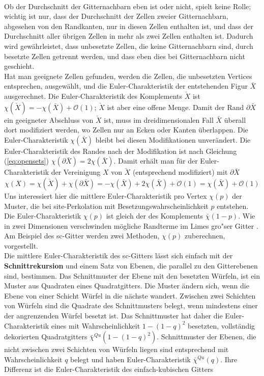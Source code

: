 \\Ob der Durchschnitt der Gitternachbarn eben ist oder nicht, spielt keine Rolle; wichtig ist nur, dass der Durchschnitt der Zellen zweier Gitternachbarn, abgesehen von den Randkanten, nur in diesen Zellen enthalten ist, und dass der Durchschnitt aller \"ubrigen Zellen in mehr als zwei Zellen enthalten ist. Dadurch wird gew\"ahrleistet, dass unbesetzte Zellen, die keine Gitternachbarn sind, durch besetzte Zellen getrennt werden, und dass eben dies bei Gitternachbarn nicht geschieht.
\\Hat man geeignete Zellen gefunden, werden die Zellen, die unbesetzten Vertices entsprechen, ausgew\"ahlt, und die Euler-Charakteristik der entstehenden Figur $\bar{X}$ ausgerechnet. Die Euler-Charakteristik des Komplements $\check{X}$ ist $\chi(\check{X})=-\chi(\bar{X})+\mathcal{O}(1)$; $\check{X}$ ist aber eine offene Menge. Damit der Rand $\partial \bar{X}$ ein geeigneter Abschluss von $\check{X}$ ist, muss im dreidimensionalen Fall $\bar{X}$ \"uberall dort modifiziert werden, wo Zellen nur an Ecken oder Kanten \"uberlappen. Die Euler-Charakteristik $\chi(\bar{X})$ bleibt bei diesen Modifikationen unver\"andert. Die Euler-Charakteristik des Randes nach der Modifikation ist nach Gleichung (\ref{eq:opensets}) $\chi(\partial \bar{X})=2\chi(\bar{X})$. Damit erh\"alt man f\"ur der Euler-Charakteristik der Vereinigung $X$ von $\check{X}$ (entsprechend modifiziert) mit $\partial \bar{X}$ 
\begin{equation}
  \chi(X)=\chi(\check{X})+\chi(\partial \bar{X})=-\chi(\bar{X})+2\chi(\bar{X})+\mathcal{O}(1)=\chi(\bar{X})+\mathcal{O}(1)
\end{equation}
Uns interessiert hier die mittlere Euler-Charakteristik pro Vertex $\chi(p)$ der Muster, die bei site-Perkolation mit Besetzungswahrscheinlichkeit $p$ entstehen. Die Euler-Charakteristik $\chi(p)$ ist gleich der des Komplements $\bar{\chi}(1-p)$. Wie in zwei Dimensionen verschwinden m\"ogliche Randterme im Limes gro"ser Gitter \cite{Jung:00}. Am Beispiel des sc-Gitter werden zwei Methoden, $\chi(p)$ zuberechnen, vorgestellt.
\\Die mittlere Euler-Charakteristik des sc-Gitters l\"asst sich einfach mit der \textbf{Schnittrekursion} und einem Satz von Ebenen, die parallel zu den Gitterebenen sind, bestimmen. Das Schnittmuster der Ebene mit den besetzten W\"urfeln, ist ein Muster aus Quadraten eines Quadratgitters. Die Muster \"andern sich, wenn die Ebene von einer Schicht W\"urfel in die n\"achste wandert. Zwischen zwei Schichten von W\"urfeln sind die Quadrate des Schnittmusters belegt, wenn mindestens einer der angrenzenden W\"urfel besetzt ist. Das Schnittmuster hat daher die Euler-Charakteristik eines mit Wahrscheinlichkeit $1-(1-q)^2$ besetzten, vollst\"andig dekorierten Quadratgitters $\bar{\chi}^{Qu}(1-(1-q)^2)$. Schnittmuster der Ebenen, die nicht zwischen zwei Schichten von W\"urfeln liegen sind entsprechend mit Wahrscheinlichkeit $q$ belegt und haben Euler-Charakteristik $\bar{\chi}^{Qu}(q)$. Ihre Differenz ist die Euler-Charakteristik des einfach-kubischen Gitters
